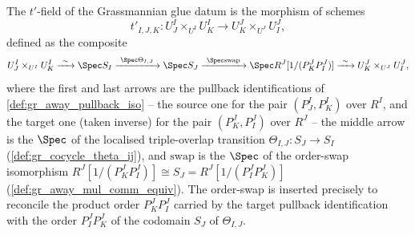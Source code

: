 \begin{definition}\leanok
  \label{def:gr_chart_transition'}
  The \(t'\)-field of the Grassmannian glue datum is the morphism of schemes
  \[
    t'_{I,J,K} : U^I_J \times_{U^I} U^I_K \longrightarrow U^J_K \times_{U^J} U^J_I ,
  \]
  defined as the composite
  \[
    U^I_J \times_{U^I} U^I_K
      \xrightarrow{\ \sim\ } \Spec S_I
      \xrightarrow{\ \Spec \Theta_{I,J}\ } \Spec S_J
      \xrightarrow{\ \Spec \mathrm{swap}\ } \Spec R^J[1/(P^J_K P^J_I)]
      \xrightarrow{\ \sim\ } U^J_K \times_{U^J} U^J_I ,
  \]
  where the first and last arrows are the pullback identifications of
  \cref{def:gr_away_pullback_iso} -- the source one for the pair \((P^I_J, P^I_K)\)
  over \(R^I\), and the target one (taken inverse) for the pair \((P^J_K, P^J_I)\)
  over \(R^J\) -- the middle arrow is the \(\Spec\) of the localised
  triple-overlap transition \(\Theta_{I,J} : S_J \to S_I\)
  (\cref{def:gr_cocycle_theta_ij}), and \(\mathrm{swap}\) is the \(\Spec\) of the
  order-swap isomorphism \(R^J[1/(P^J_K P^J_I)] \cong S_J = R^J[1/(P^J_I P^J_K)]\)
  (\cref{def:gr_away_mul_comm_equiv}). The order-swap is inserted precisely to
  reconcile the product order \(P^J_K P^J_I\) carried by the target pullback
  identification with the order \(P^J_I P^J_K\) of the codomain \(S_J\) of
  \(\Theta_{I,J}\).
\end{definition}

